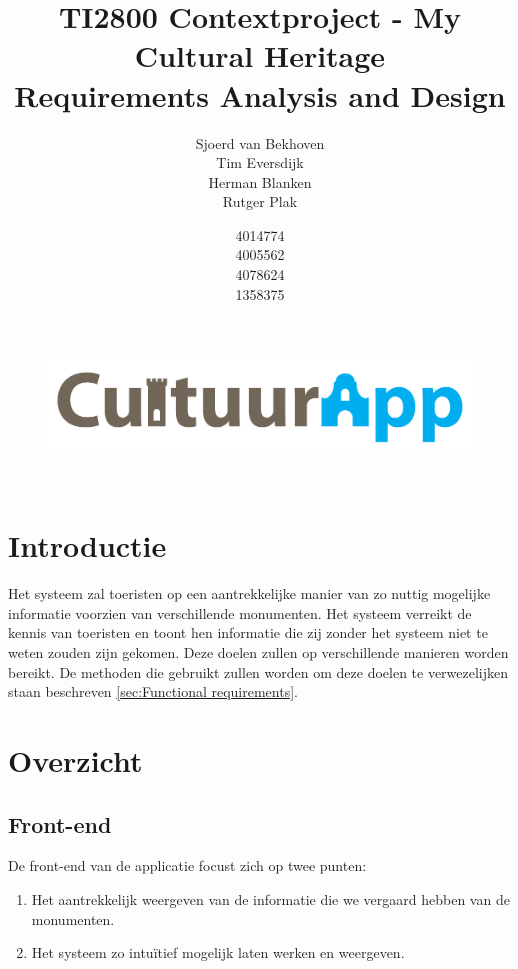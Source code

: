 \documentclass[a4paper,10pt]{article}
\newcommand{\rsection}[1]{
\section{#1}\label{sec:#1}
}
\newcommand{\rsubsection}[1]{
\subsection{#1}\label{sec:sub:#1}
}
\begin{document}
\title{TI2800 Contextproject - My Cultural Heritage\\ Requirements Analysis and Design}
\author{Sjoerd van Bekhoven\\ Tim Eversdijk \\ Herman Blanken \\ Rutger Plak \and 4014774 \\ 4005562 \\ 4078624 \\ 1358375}

\maketitle
\thispagestyle{empty}
\vspace{10cm}
\begin{figure}[ht!]
	\centering
	\includegraphics[width=\textwidth]{cultuurapp-logo.png}
\end{figure}
\clearpage
\setcounter{page}{0}
\thispagestyle{empty}
\
\clearpage
\tableofcontents

\clearpage
\rsection{Introductie}
Het systeem  zal toeristen  op een aantrekkelijke manier van zo nuttig mogelijke informatie voorzien van verschillende monumenten. Het systeem verreikt de kennis van toeristen en toont hen informatie die zij zonder het systeem niet te weten zouden zijn gekomen. Deze doelen zullen op verschillende manieren worden bereikt. De methoden die gebruikt zullen worden om deze doelen te verwezelijken staan beschreven \ref{sec:Functional requirements}.

\rsection{Overzicht}
	\rsubsection{Front-end}
	De front-end van de applicatie focust zich op twee punten:
	\begin{enumerate}
		\item Het aantrekkelijk weergeven van de informatie die we vergaard hebben van de monumenten.
		\item Het systeem zo intu\"itief mogelijk laten werken en weergeven.
	\end{enumerate}
				
\end{document}
